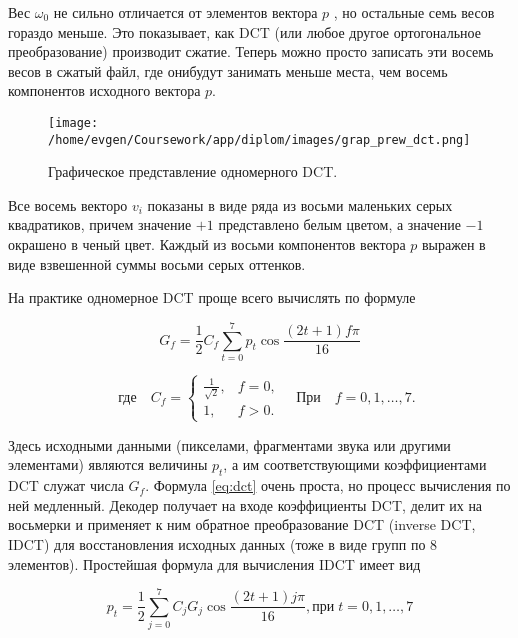 Вес $\omega_0$ не сильно отличается от элементов вектора $p$ , но остальные семь весов гораздо меньше. 
Это показывает, как DCT (или любое другое ортогональное преобразование) производит сжатие. 
Теперь можно просто записать эти восемь весов в сжатый файл, 
где онибудут занимать меньше места, чем восемь компонентов исходного вектора $p$.

\begin{figure}[h!]
    \centering
    \texttt{[image: /home/evgen/Coursework/app/diplom/images/grap\_prew\_dct.png]}
    \caption{Графическое представление одномерного DCT.}
    \label{fig:gr_dt}
\end{figure}

\clearpage
Все восемь векторо $v_i$ показаны в виде ряда из восьми маленьких серых квадратиков,
причем значение $+1$ представлено белым цветом, а значение $-1$ окрашено в ченый цвет. 
Каждый из восьми компонентов вектора $p$ выражен в виде взвешенной суммы восьми серых оттенков.

На практике одномерное DCT проще всего вычислять по формуле

\begin{equation}
    G_f = \frac{1}{2}C_f \sum_{t=0}^{7} p_t \cos{\frac{(2t+1)f \pi}{16}}
    \label{eq:dct}
\end{equation}

$$
\quad \text{где} \quad C_f = 
\left\{
    \begin{array}{ll}
        \frac{1}{\sqrt{2}}, & f = 0, \\
        1, & f > 0. 
    \end{array}
\right.
\quad \text{При} \quad f = 0, 1, \dots, 7.
$$


Здесь исходными данными (пикселами, фрагментами звука или дру­гими элементами) являются величины $p_t$, 
а им соответствующими коэффициентами DCT служат числа $G_f$. 
Формула \eqref{eq:dct} очень про­ста, но процесс вычисления по ней медленный. 
Декодер получает на входе ко­эффициенты DCT, делит их на восьмерки и применяет к ним обрат­ное преобразование DCT (inverse DCT, IDCT) 
для восстановления исходных данных (тоже в виде групп по 8 элементов). Простейшая формула для вычисления IDCT имеет вид

\begin{equation}
    p_t = \frac{1}{2} \sum_{j=0}^{7} C_j G_j \cos{\frac{(2t+1)j \pi}{16}, \text{при} \; t = 0,1, \dots, 7}
\end{equation}


